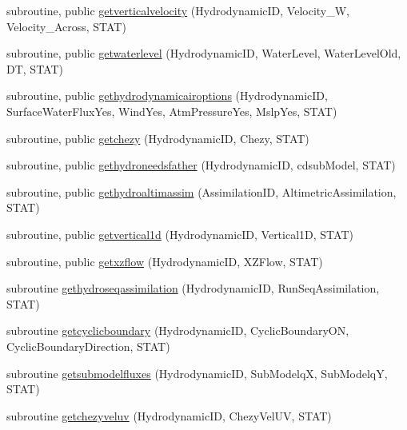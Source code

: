 \begin{DoxyCompactItemize}
\item 
subroutine, public \mbox{\hyperlink{namespacemodulehydrodynamic_a6f64fd12742f48039f81460df9c0cd42}{getverticalvelocity}} (Hydrodynamic\+ID, Velocity\+\_\+W, Velocity\+\_\+\+Across, S\+T\+AT)
\item 
subroutine, public \mbox{\hyperlink{namespacemodulehydrodynamic_ad29ca3143969ea453d432e0a8f2dde2d}{getwaterlevel}} (Hydrodynamic\+ID, Water\+Level, Water\+Level\+Old, DT, S\+T\+AT)
\item 
subroutine, public \mbox{\hyperlink{namespacemodulehydrodynamic_a890cdf33bc8b461d93da82f9150c774e}{gethydrodynamicairoptions}} (Hydrodynamic\+ID, Surface\+Water\+Flux\+Yes, Wind\+Yes, Atm\+Pressure\+Yes, Mslp\+Yes, S\+T\+AT)
\item 
subroutine, public \mbox{\hyperlink{namespacemodulehydrodynamic_a377c174d00228d8f36d2d1c5e10a7f32}{getchezy}} (Hydrodynamic\+ID, Chezy, S\+T\+AT)
\item 
subroutine, public \mbox{\hyperlink{namespacemodulehydrodynamic_a391b4f9e43b2d5d986bedc666b00da4d}{gethydroneedsfather}} (Hydrodynamic\+ID, cdsub\+Model, S\+T\+AT)
\item 
subroutine, public \mbox{\hyperlink{namespacemodulehydrodynamic_a4d4e017a80d72328f2cdd7b71420fbf3}{gethydroaltimassim}} (Assimilation\+ID, Altimetric\+Assimilation, S\+T\+AT)
\item 
subroutine, public \mbox{\hyperlink{namespacemodulehydrodynamic_a384df1b51bd6ad1c528b5658c4414bae}{getvertical1d}} (Hydrodynamic\+ID, Vertical1D, S\+T\+AT)
\item 
subroutine, public \mbox{\hyperlink{namespacemodulehydrodynamic_af349d31454a6c7a674ed8d54430b0e52}{getxzflow}} (Hydrodynamic\+ID, X\+Z\+Flow, S\+T\+AT)
\item 
subroutine \mbox{\hyperlink{namespacemodulehydrodynamic_ab2980a48cd10c0f2def3784cbf27608c}{gethydroseqassimilation}} (Hydrodynamic\+ID, Run\+Seq\+Assimilation, S\+T\+AT)
\item 
subroutine \mbox{\hyperlink{namespacemodulehydrodynamic_a073f4ba07360a6b7522733db2651b41d}{getcyclicboundary}} (Hydrodynamic\+ID, Cyclic\+Boundary\+ON, Cyclic\+Boundary\+Direction, S\+T\+AT)
\item 
subroutine \mbox{\hyperlink{namespacemodulehydrodynamic_a2b0f8d10e1768612e8bc67bcc2535ffe}{getsubmodelfluxes}} (Hydrodynamic\+ID, Sub\+ModelqX, Sub\+ModelqY, S\+T\+AT)
\item 
subroutine \mbox{\hyperlink{namespacemodulehydrodynamic_a95c4b43f87d68ca27ecae9520c33f91f}{getchezyveluv}} (Hydrodynamic\+ID, Chezy\+Vel\+UV, S\+T\+AT)

\end{DoxyCompactItemize}
